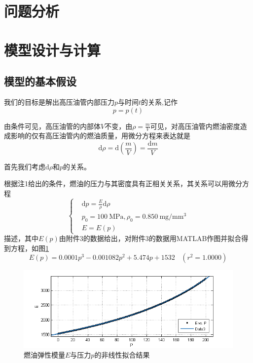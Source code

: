 \documentclass[12pt,AutoFakeBold]{article}%
\newcommand{\dif}{\mathrm{d}}
\begin{document}

    \section{问题分析}

    \section{模型设计与计算}
    \subsection{模型的基本假设}
    我们的目标是解出高压油管内部压力$p$与时间$t$的关系,记作
    \begin{equation}
        p=p(t)
    \end{equation}
    \par
    由条件可见，高压油管的内部体$V$不变，由$\rho=\frac{m}{V}$可见，对高压油管内燃油密度造成影响的仅有高压油管内的燃油质量，用微分方程来表达就是
    \begin{equation}
        \dif\rho=\dif\left(\frac{m}{V}\right)=\frac{\dif m}{V}
        \label{eq1}
    \end{equation}
    \par
    首先我们考虑$\dif\rho$和$p$的关系。\par
    根据注1给出的条件，燃油的压力与其密度具有正相关关系，其关系可以用微分方程
    \begin{equation}
         \begin{cases}
            &\dif p=\frac{E}{\rho}\dif\rho\\
            &p_0=\SI{100}{\MPa},\rho_0=\SI{0.850}{\mg\per\cubic\mm}\\
            &E=E(p)
        \end{cases}
        \label{pandrho}
    \end{equation}
    描述，其中$E(p)$由附件3的数据给出，对附件3的数据用MATLAB作图并拟合得到方程，如图\ref{data3}
    \begin{equation}
        E(p)=0.0001p^3-0.001082p^2+5.474p+1532\ \ \ \ (r^2=1.0000)
    \end{equation}
    \begin{figure}[H]
        \centering
        \includegraphics[scale=0.8]{figure/data3.png}
        \caption{燃油弹性模量$E$与压力$p$的非线性拟合结果}
        \label{data3}
    \end{figure}
\end{document}
